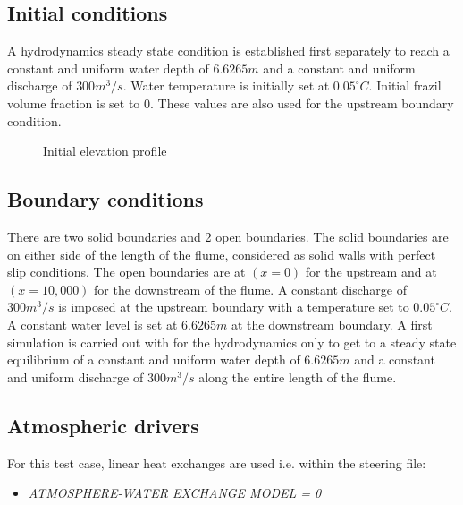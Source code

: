\subsection{Initial conditions}

A hydrodynamics steady state condition is established first separately to reach a constant and uniform water depth of $6.6265m$ and a constant and uniform discharge of $300m^3/s$.
Water temperature is initially set at $0.05^\circ C$. Initial frazil volume fraction is set to $0$. These values are also used for the upstream boundary condition.

\begin{figure}[H]
    \begin{center}
    \end{center}
    \caption{Initial elevation profile}
    \label{fig:growth_profile}
\end{figure}

\subsection{Boundary conditions}

There are two solid boundaries and 2 open boundaries.
The solid boundaries are on either side of the length of the flume, considered as solid walls with perfect slip conditions.
The open boundaries are at $(x=0)$ for the upstream and at $(x=10,000)$ for the downstream of the flume. A constant discharge of $300m^3/s$ is imposed at the upstream boundary with a temperature set to $0.05^{\circ} C$. A constant water level is set at $6.6265m$ at the downstream boundary.
A first simulation is carried out with for the hydrodynamics only to get to a steady state equilibrium of a constant and uniform water depth of $6.6265m$ and a constant and uniform discharge of $300m^3/s$ along the entire length of the flume.


\subsection{Atmospheric drivers}

For this test case, linear heat exchanges are used i.e. within the \khione steering file:
\begin{itemize}
	\item\textit{ATMOSPHERE-WATER EXCHANGE MODEL = 0}
\end{itemize}

